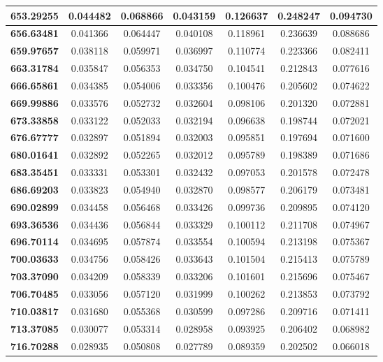 \documentclass[10pt, a4paper]{article}
\begin{document}
\begin{appendices}
\begin{longtable}{|c|c|c|c|c|c|c|}
	\textbf{653.29255} & 0.044482 & 0.068866 & 0.043159 & 0.126637 & 0.248247 & 0.094730 \\ \hline
	\textbf{656.63481} & 0.041366 & 0.064447 & 0.040108 & 0.118961 & 0.236639 & 0.088686 \\ \hline
	\textbf{659.97657} & 0.038118 & 0.059971 & 0.036997 & 0.110774 & 0.223366 & 0.082411 \\ \hline
	\textbf{663.31784} & 0.035847 & 0.056353 & 0.034750 & 0.104541 & 0.212843 & 0.077616 \\ \hline
	\textbf{666.65861} & 0.034385 & 0.054006 & 0.033356 & 0.100476 & 0.205602 & 0.074622 \\ \hline
	\textbf{669.99886} & 0.033576 & 0.052732 & 0.032604 & 0.098106 & 0.201320 & 0.072881 \\ \hline
	\textbf{673.33858} & 0.033122 & 0.052033 & 0.032194 & 0.096638 & 0.198744 & 0.072021 \\ \hline
	\textbf{676.67777} & 0.032897 & 0.051894 & 0.032003 & 0.095851 & 0.197694 & 0.071600 \\ \hline
	\textbf{680.01641} & 0.032892 & 0.052265 & 0.032012 & 0.095789 & 0.198389 & 0.071686 \\ \hline
	\textbf{683.35451} & 0.033331 & 0.053301 & 0.032432 & 0.097053 & 0.201578 & 0.072478 \\ \hline
	\textbf{686.69203} & 0.033823 & 0.054940 & 0.032870 & 0.098577 & 0.206179 & 0.073481 \\ \hline
	\textbf{690.02899} & 0.034458 & 0.056468 & 0.033426 & 0.099736 & 0.209895 & 0.074120 \\ \hline
	\textbf{693.36536} & 0.034436 & 0.056844 & 0.033329 & 0.100112 & 0.211708 & 0.074967 \\ \hline
	\textbf{696.70114} & 0.034695 & 0.057874 & 0.033554 & 0.100594 & 0.213198 & 0.075367 \\ \hline
	\textbf{700.03633} & 0.034756 & 0.058426 & 0.033643 & 0.101504 & 0.215413 & 0.075789 \\ \hline
	\textbf{703.37090} & 0.034209 & 0.058339 & 0.033206 & 0.101601 & 0.215696 & 0.075467 \\ \hline
	\textbf{706.70485} & 0.033056 & 0.057120 & 0.031999 & 0.100262 & 0.213853 & 0.073792 \\ \hline
	\textbf{710.03817} & 0.031680 & 0.055368 & 0.030599 & 0.097286 & 0.209716 & 0.071411 \\ \hline
	\textbf{713.37085} & 0.030077 & 0.053314 & 0.028958 & 0.093925 & 0.206402 & 0.068982 \\ \hline
	\textbf{716.70288} & 0.028935 & 0.050808 & 0.027789 & 0.089359 & 0.202502 & 0.066018 \\ \hline

\end{longtable}
\end{appendices}
\end{document}
